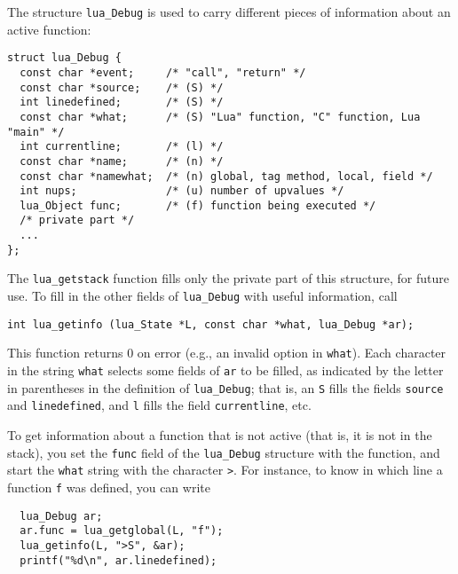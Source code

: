 \documentclass[11pt]{article}
\newcommand{\Deffunc}[1]{\index{#1}}
\begin{document}
\Deffunc{lua_Debug}
The structure \verb|lua_Debug| is used to carry different pieces of information
about an active function:
\begin{verbatim}
struct lua_Debug {
  const char *event;     /* "call", "return" */
  const char *source;    /* (S) */
  int linedefined;       /* (S) */
  const char *what;      /* (S) "Lua" function, "C" function, Lua "main" */
  int currentline;       /* (l) */
  const char *name;      /* (n) */
  const char *namewhat;  /* (n) global, tag method, local, field */
  int nups;              /* (u) number of upvalues */
  lua_Object func;       /* (f) function being executed */
  /* private part */
  ...
};
\end{verbatim}
The \verb|lua_getstack| function fills only the private part
of this structure, for future use.
To fill in the other fields of \verb|lua_Debug| with useful information,
call \Deffunc{lua_getinfo}
\begin{verbatim}
int lua_getinfo (lua_State *L, const char *what, lua_Debug *ar);
\end{verbatim}
This function returns 0 on error
(e.g., an invalid option in \verb|what|).
Each character in the string \verb|what|
selects some fields of \verb|ar| to be filled,
as indicated by the letter in parentheses in the definition of \verb|lua_Debug|;
that is, an \verb|S| fills the fields \verb|source| and \verb|linedefined|,
and \verb|l| fills the field \verb|currentline|, etc.

To get information about a function that is not active (that is,
it is not in the stack),
you set the \verb|func| field of the \verb|lua_Debug| structure
with the function,
and start the \verb|what| string with the character \verb|>|.
For instance, to know in which line a function \verb|f| was defined,
you can write
\begin{verbatim}
  lua_Debug ar;
  ar.func = lua_getglobal(L, "f");
  lua_getinfo(L, ">S", &ar);
  printf("%d\n", ar.linedefined);
\end{verbatim}
\end{document}
